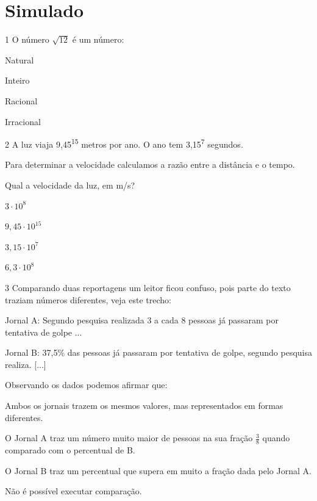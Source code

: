 \chapter[Simulado 4]{Simulado}

\num{1} O número $\sqrt{12}$ é um número:

\begin{escolha}

\item
  Natural
\item
  Inteiro
\item
  Racional
\item
  Irracional
\end{escolha}


\num{2} A luz viaja 9,45\textsuperscript{15} metros por ano. O ano tem 3,15\textsuperscript{7} segundos.

Para determinar a velocidade calculamos a razão entre a distância e o
tempo.

Qual a velocidade da luz, em m/s?

\begin{escolha}
\item
  $3 \cdot 10^{8}$
\item
  $9,45 \cdot 10^{15}$
\item
  $3,15 \cdot 10^{7}$
\item
  $6,3 \cdot 10^{8}$
\end{escolha}

\num{3} Comparando duas reportagens um leitor ficou confuso, pois parte do texto traziam números diferentes, veja este trecho:

Jornal A: Segundo pesquisa realizada 3 a cada 8 pessoas já passaram por
tentativa de golpe ...

Jornal B: 37,5\% das pessoas já passaram por tentativa de golpe, segundo
pesquisa realiza. {[}...{]}

Observando os dados podemos afirmar que:

\begin{escolha}

\item
  Ambos os jornais trazem os mesmos valores, mas representados em formas
  diferentes.
\item
  O Jornal A traz um número muito maior de pessoas na sua fração
  $\frac{3}{8}$ quando comparado com o percentual de B.
\item
  O Jornal B traz um percentual que supera em muito a fração dada pelo
  Jornal A.
\item
  Não é possível executar comparação.
\end{escolha}


